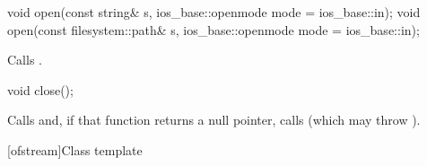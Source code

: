 %
\begin{itemdecl}
void open(const string& s, ios_base::openmode mode = ios_base::in);
void open(const filesystem::path& s, ios_base::openmode mode = ios_base::in);
\end{itemdecl}

\begin{itemdescr}
\pnum
\effects
Calls .
\end{itemdescr}

%
\begin{itemdecl}
void close();
\end{itemdecl}

\begin{itemdescr}
\pnum
\effects
Calls
and, if that function returns
a null pointer,
calls
(which may throw
).
\end{itemdescr}

[ofstream]{Class template }

